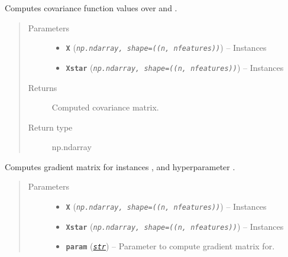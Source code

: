 \documentclass[letterpaper,10pt,english]{sphinxmanual}
\begin{document}
\begin{fulllineitems}
\begin{fulllineitems}
\label{pyGPGO.covfunc:pyGPGO.covfunc.gammaExponential.K}
Computes covariance function values over  and .
\begin{quote}\begin{description}
\item[{Parameters}] \leavevmode\begin{itemize}
\item {} 
\textbf{\texttt{X}} (\emph{\texttt{np.ndarray, shape=((n, nfeatures))}}) -- Instances

\item {} 
\textbf{\texttt{Xstar}} (\emph{\texttt{np.ndarray, shape=((n, nfeatures))}}) -- Instances

\end{itemize}

\item[{Returns}] \leavevmode
Computed covariance matrix.

\item[{Return type}] \leavevmode
np.ndarray

\end{description}\end{quote}

\end{fulllineitems}


\begin{fulllineitems}
\label{pyGPGO.covfunc:pyGPGO.covfunc.gammaExponential.gradK}
Computes gradient matrix for instances ,  and hyperparameter .
\begin{quote}\begin{description}
\item[{Parameters}] \leavevmode\begin{itemize}
\item {} 
\textbf{\texttt{X}} (\emph{\texttt{np.ndarray, shape=((n, nfeatures))}}) -- Instances

\item {} 
\textbf{\texttt{Xstar}} (\emph{\texttt{np.ndarray, shape=((n, nfeatures))}}) -- Instances

\item {} 
\textbf{\texttt{param}} (\href{https://docs.python.org/2/library/functions.html\#str}{\emph{\texttt{str}}}) -- Parameter to compute gradient matrix for.


\end{itemize}
\end{description}
\end{quote}
\end{fulllineitems}
\end{fulllineitems}
\end{document}
